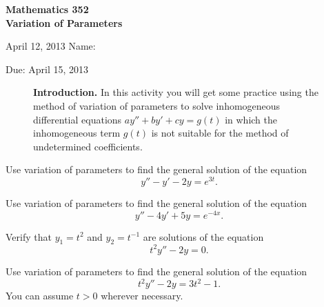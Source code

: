 \documentclass[11pt]{exam}
\begin{document}
\noindent
\textbf{{\large Mathematics 352 \\ Variation of Parameters}}

\noindent
April 12, 2013 \hfill Name: \underline{\hspace{3in}} 

\noindent
Due: April 15, 2013

\noindent
\begin{figure}[h]
\centering
\begin{minipage}[b]{0.85\linewidth}
\textbf{Introduction.} In this activity you will get some practice using the method of variation of parameters to solve inhomogeneous differential equations $ay'' + by' + cy = g(t)$ in which the inhomogeneous term $g(t)$ is not suitable for the method of undetermined coefficients.
\end{minipage}
\end{figure}

\begin{questions}

\question Use variation of parameters to find the general solution of the equation
\[
    y'' - y' - 2y = e^{3t}.
\]


\question Use variation of parameters to find the general solution of the equation
\[
    y'' - 4y' + 5y = e^{-4x}.
\]


\newpage

\question Verify that $y_1 = t^2$ and $y_2 = t^{-1}$ are solutions of the equation
\[
    t^2 y'' - 2y = 0.
\]


\question Use variation of parameters to find the general solution of the equation
\[
    t^2 y'' - 2y = 3t^2 - 1.
\]
You can assume $t > 0$ wherever necessary.


\end{questions}
\end{document}
